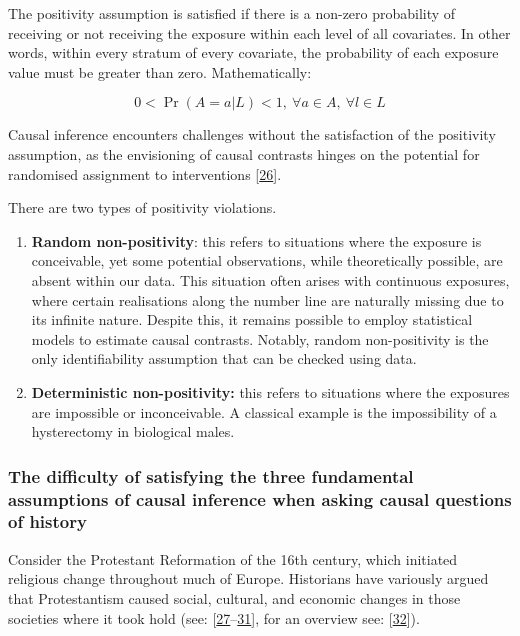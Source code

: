 \documentclass[
  singlecolumn]{article}
\begin{document}
The positivity assumption is satisfied if there is a non-zero
probability of receiving or not receiving the exposure within each level
of all covariates. In other words, within every stratum of every
covariate, the probability of each exposure value must be greater than
zero. Mathematically:

\[
0 < \Pr(A=a|L)<1, ~ \forall a \in A, ~ \forall l \in L
\]

Causal inference encounters challenges without the satisfaction of the
positivity assumption, as the envisioning of causal contrasts hinges on
the potential for randomised assignment to interventions
{[}\protect\hyperlink{ref-westreich2010}{26}{]}.

There are two types of positivity violations.

\begin{enumerate}
\def\labelenumi{\arabic{enumi}.}
\item
  \textbf{Random non-positivity}: this refers to situations where the
  exposure is conceivable, yet some potential observations, while
  theoretically possible, are absent within our data. This situation
  often arises with continuous exposures, where certain realisations
  along the number line are naturally missing due to its infinite
  nature. Despite this, it remains possible to employ statistical models
  to estimate causal contrasts. Notably, random non-positivity is the
  only identifiability assumption that can be checked using data.
\item
  \textbf{Deterministic non-positivity:} this refers to situations where
  the exposures are impossible or inconceivable. A classical example is
  the impossibility of a hysterectomy in biological males.
\end{enumerate}

\hypertarget{the-difficulty-of-satisfying-the-three-fundamental-assumptions-of-causal-inference-when-asking-causal-questions-of-history}{%
\subsubsection{The difficulty of satisfying the three fundamental
assumptions of causal inference when asking causal questions of
history}\label{the-difficulty-of-satisfying-the-three-fundamental-assumptions-of-causal-inference-when-asking-causal-questions-of-history}}

Consider the Protestant Reformation of the 16th century, which initiated
religious change throughout much of Europe. Historians have variously
argued that Protestantism caused social, cultural, and economic changes
in those societies where it took hold (see:
{[}\protect\hyperlink{ref-weber1905}{27}--\protect\hyperlink{ref-basten2013}{31}{]},
for an overview see: {[}\protect\hyperlink{ref-becker2016}{32}{]}).
\end{document}
